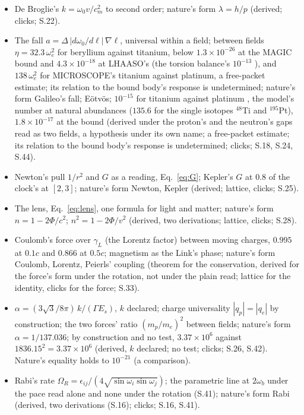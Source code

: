 \documentclass[pdflatex,sn-mathphys-num]{sn-jnl}
\theoremstyle{thmstyleone}
\theoremstyle{thmstyletwo}
\begin{document}
\begin{itemize}[nosep,leftmargin=1.2em]
\item De Broglie's $k = \omega_0 v / c_m^2$ to second order; nature's form $\lambda = h / p$ (derived; clicks; S.22).
\item The fall $a = \Delta\,|d\omega_0 / d\ell|\,\nabla\ell$, universal within a field; between fields $\eta = 32.3\,\omega_e^2$ for beryllium against titanium, below $1.3 \times 10^{-26}$ at the MAGIC bound and $4.3 \times 10^{-18}$ at LHAASO's (the torsion balance's $10^{-13}$ \cite{schlamminger}), and $138\,\omega_e^2$ for MICROSCOPE's titanium against platinum, a free-packet estimate; its relation to the bound body's response is undetermined; nature's form Galileo's fall; E\"otv\"os; $10^{-15}$ for titanium against platinum \cite{microscope}, the model's number at natural abundances ($135.6$ for the single isotopes $^{48}$Ti and $^{195}$Pt), $1.8 \times 10^{-17}$ at the bound (derived under the proton's and the neutron's gaps read as two fields, a hypothesis under its own name; a free-packet estimate; its relation to the bound body's response is undetermined; clicks; S.18, S.24, S.44).
\item Newton's pull $1 / r^2$ and $G$ as a reading, Eq.~\eqref{eq:G}; Kepler's $G$ at $0.8$ of the clock's at $[2, 3]$; nature's form Newton, Kepler (derived; lattice, clicks; S.25).
\item The lens, Eq.~\eqref{eq:lens}, one formula for light and matter; nature's form $n = 1 - 2\Phi / c^2$; $n^2 = 1 - 2\Phi / v^2$ (derived, two derivations; lattice, clicks; S.28).
\item Coulomb's force over $\gamma_L$ (the Lorentz factor) between moving charges, $0.995$ at $0.1c$ and $0.866$ at $0.5c$; magnetism as the Link's phase; nature's form Coulomb, Lorentz, Peierls' coupling (theorem for the conservation, derived for the force's form under the rotation, not under the plain read; lattice for the identity, clicks for the force; S.33).
\item $\alpha = (3\sqrt 3 / 8\pi)\,k / (\Gamma E_s)$, $k$ declared; charge universality $|q_p| = |q_e|$ by construction; the two forces' ratio $(m_p / m_e)^2$ between fields; nature's form $\alpha = 1 / 137.036$; by construction and no test, $3.37 \times 10^6$ against $1836.15^2 = 3.37 \times 10^6$ (derived, $k$ declared; no test; clicks; S.26, S.42). Nature's equality holds to $10^{-21}$ \cite{bressi} (a comparison).
\item Rabi's rate $\Omega_R = \epsilon_{ij} / (4\sqrt{\sin\omega_i\sin\omega_j})$; the parametric line at $2\omega_b$ under the pace read alone and none under the rotation (S.41); nature's form Rabi (derived, two derivations (S.16); clicks; S.16, S.41).

\end{itemize}
\end{document}

